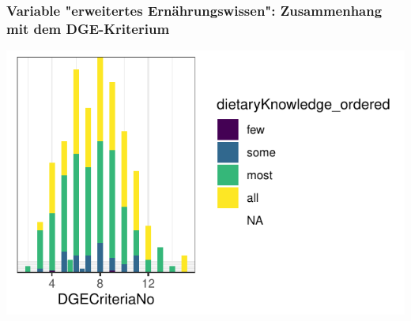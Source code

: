 \begin{frame}[fragile]
\frametitle{Variable "erweitertes Ernährungswissen": Zusammenhang mit dem DGE-Kriterium}
\begin{knitrout}\footnotesize
{}\color{fgcolor}\begin{kframe}


{\ttfamily\noindent\color{warningcolor}{\#\# Warning: Removed 244 rows containing missing values (position\_stack).}}\end{kframe}

{\centering \includegraphics[width=\maxwidth]{figure/beamer-dietaryDGEplot-1} 

}



\end{knitrout}
\end{frame}


